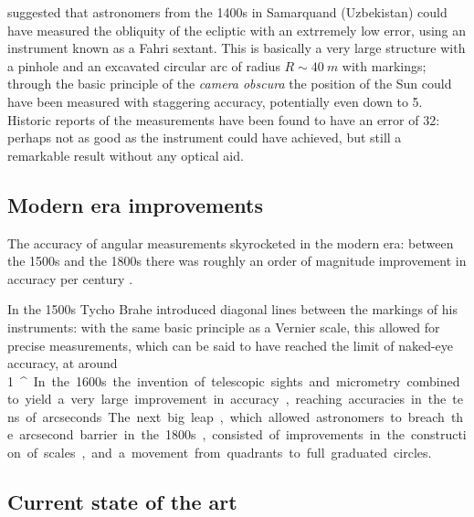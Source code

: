 \documentclass[main.tex]{subfiles}
\begin{document}
\textcite[]{sattarovMainInstrumentUlugh2009} suggested that astronomers from the 1400s in Samarquand (Uzbekistan) could have measured the obliquity of the ecliptic with an extrremely low error, using an instrument known as a Fahri sextant.
This is basically a very large structure with a pinhole and an excavated circular arc of radius \(R \sim \SI{40}{m}\) with markings; through the basic principle of the \emph{camera obscura} the position of the Sun could have been measured with staggering accuracy, potentially even down to \SI{5}{\arcsec}.
Historic reports of the measurements have been found to have an error of \SI{32}{\arcsec}: perhaps not as good as the instrument could have achieved, but still a remarkable result without any optical aid. 

\subsection{Modern era improvements}

The accuracy of angular measurements skyrocketed in the modern era: between the 1500s and the 1800s there was roughly an order of magnitude improvement in accuracy per century \cite[]{chapmanAccuracyAngularMeasuring1983}.

In the 1500s Tycho Brahe introduced diagonal lines between the markings of his instruments: with the same basic principle as a Vernier scale, this allowed for precise measurements, which can be said to have reached the limit of naked-eye accuracy, at around \SI{1}{^\prime}. 

In the 1600s the invention of telescopic sights and micrometry combined to yield a very large improvement in accuracy, reaching accuracies in the tens of arcseconds. 

The next big leap, which allowed astronomers to breach the arcsecond barrier in the 1800s, consisted of improvements in the construction of scales, and a movement from quadrants to full graduated circles. 

\subsection{Current state of the art}
\end{document}
